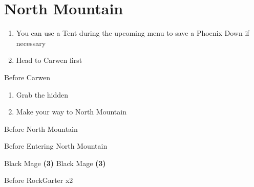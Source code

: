\chapter{North Mountain}

\vspace{\baselineskip}

\begin{paracol}{2}
    
\begin{enumerate}
    \item You can use a Tent during the upcoming menu to save a Phoenix Down if necessary
    \item Head to Carwen first
\end{enumerate}

\switchcolumn
\begin{steproute}{Before Carwen}
\end{steproute}

\switchcolumn
\resume
\begin{enumerate}[resume]
    \item Grab the hidden 
    \item Make your way to North Mountain
\end{enumerate}

\switchcolumn
\begin{steproute}{Before North Mountain}
\end{steproute}

\switchcolumn
\begin{menu}{Before Entering North Mountain}
	\varwb
    \begin{itemMenu}
        \potionMenu {}
    \end{itemMenu}
    \begin{jobMenu}
        \bartz Black Mage \textbf{(3\pointLeft)}
        \lenna Black Mage \textbf{(3\pointLeft)}
	\end{jobMenu}
    \varwe
\end{menu}

\switchcolumn
\begin{steproute}{Before RockGarter x2}
\end{steproute}


\end{paracol}

